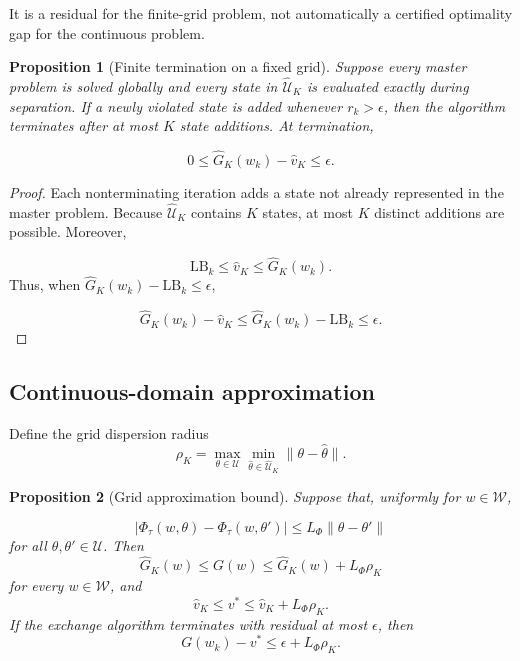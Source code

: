 \documentclass[11pt,a4paper]{article}
\newtheorem{proposition}{Proposition}
\theoremstyle{definition}
\theoremstyle{remark}
\newcommand{\U}{\mathcal{U}}
\newcommand{\Ugrid}{\widehat{\mathcal{U}}}
\newcommand{\W}{\mathcal{W}}
\begin{document}
It is a residual for the finite-grid problem, not automatically a certified
optimality gap for the continuous problem.

\begin{proposition}[Finite termination on a fixed grid]
\label{prop:grid-termination}
Suppose every master problem is solved globally and every state in
\(\Ugrid_K\) is evaluated exactly during separation. If a newly violated state
is added whenever \(r_k>\epsilon\), then the algorithm terminates after at
most \(K\) state additions. At termination,

\[
0\le
\widehat G_K(w_k)-\widehat v_K
\le\epsilon.
\]
\end{proposition}

\begin{proof}
Each nonterminating iteration adds a state not already represented in the
master problem. Because \(\Ugrid_K\) contains \(K\) states, at most \(K\)
distinct additions are possible. Moreover,

\[
\mathrm{LB}_k\le\widehat v_K
\le\widehat G_K(w_k).
\]
Thus, when
\(\widehat G_K(w_k)-\mathrm{LB}_k\le\epsilon\),

\[
\widehat G_K(w_k)-\widehat v_K
\le
\widehat G_K(w_k)-\mathrm{LB}_k
\le\epsilon.
\]
\end{proof}

\subsection{Continuous-domain approximation}

Define the grid dispersion radius
\begin{equation}
\rho_K
=
\max_{\theta\in\U}
\min_{\widehat\theta\in\Ugrid_K}
\|\theta-\widehat\theta\|.
\label{eq:dispersion}
\end{equation}

\begin{proposition}[Grid approximation bound]
\label{prop:grid-bound}
Suppose that, uniformly for \(w\in\W\),

\[
|\Phi_\tau(w,\theta)-\Phi_\tau(w,\theta')|
\le
L_\Phi\|\theta-\theta'\|
\]
for all \(\theta,\theta'\in\U\). Then
\begin{equation}
\widehat G_K(w)
\le
G(w)
\le
\widehat G_K(w)+L_\Phi\rho_K
\label{eq:uniform-grid-bound}
\end{equation}
for every \(w\in\W\), and
\begin{equation}
\widehat v_K
\le
v^*
\le
\widehat v_K+L_\Phi\rho_K.
\label{eq:value-bound}
\end{equation}
If the exchange algorithm terminates with residual at most \(\epsilon\), then
\begin{equation}
G(w_k)-v^*
\le
\epsilon+L_\Phi\rho_K.
\label{eq:candidate-bound}
\end{equation}
\end{proposition}
\end{document}
